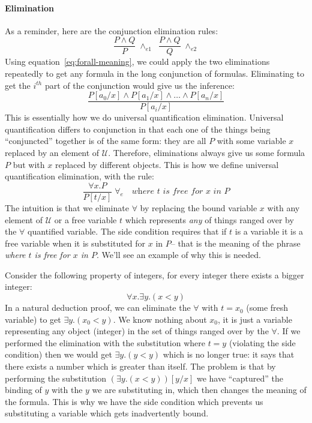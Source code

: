 \paragraph{Elimination} As a reminder, here
are the conjunction elimination rules:
%
\begin{equation*}
\dfrac{P \wedge Q}
        {P} \; {\wedge_{e1}}
\;\;
\dfrac{P \wedge Q}
  {Q} \; {\wedge_{e2}}
\end{equation*}
%
Using equation~\eqref{eq:forall-meaning}, we could apply the two
eliminations repeatedly to get any formula in the long conjunction of
formulas. Eliminating to get the $i^{th}$ part of the conjunction
would give us the inference:
%
\begin{equation*}
  \dfrac{P[a_0/x] \wedge P[a_1/x] \wedge \ldots \wedge P[a_{n}/x]}
  {P[a_i/x]}
\end{equation*}
%
This is essentially how we do universal quantification elimination.
Universal quantification differs to conjunction in that each one of the things
being ``conjuncted'' together is of the same form: they are all $P$
with some variable $x$ replaced by an element of $\mathcal{U}$.
Therefore, eliminations
always give us some formula $P$ but with $x$ replaced by different objects. This is how
we define universal quantification elimination, with the rule:
%
\begin{equation*}
  \dfrac{\forall x . P}
  {P [t/x]} \; {\forall_e} \quad \textit{where $t$ is free for $x$ in $P$}
\end{equation*}
%
The intuition is that we eliminate $\forall$ by replacing the bound
variable $x$ with any element of $\mathcal{U}$ or a
 free variable $t$ which represents
\emph{any} of things ranged over by the $\forall$ quantified variable.
The side condition requires that if $t$ is a variable it is a free variable
 when it is substituted for $x$ in $P$-- that is the meaning of the
 phrase \emph{where $t$ is free for $x$ in $P$}. We'll see an example of
why this is needed.

Consider the following property of integers, for
every integer there exists a bigger integer:
%
\begin{equation*}
  \forall x . \exists y . (x < y)
\end{equation*}
In a natural deduction proof, we can eliminate the $\forall$ with
$t = x_0$ (some fresh variable) to get $\exists y . (x_0 < y)$. We
know nothing about $x_0$, it is just a variable representing any
object (integer) in the set of things ranged over by the $\forall$.
If we performed the elimination with the substitution where
$t = y$ (violating the side condition) then we would get
$\exists y . (y < y)$ which is no longer true: it says that there
exists a number which is greater than itself. The problem is that by
performing the substitution $(\exists y. (x < y))[y/x]$ we have
``captured'' the binding of $y$ with the $y$ we are substituting in,
which then changes the meaning of the formula. This is why we have the
side condition which prevents us substituting a variable which
gets inadvertently bound.

